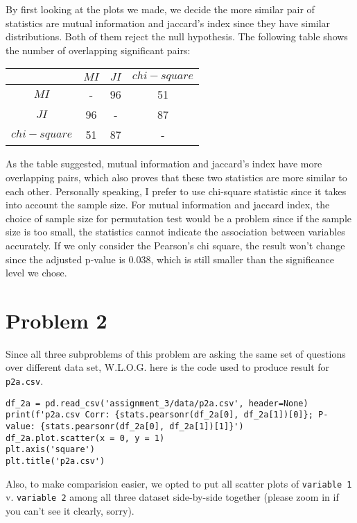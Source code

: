 \documentclass[12pt]{article}
\newcommand{\ilc}{\texttt}
\begin{document}
By first looking at the plots we made, we decide the more similar pair of statistics are mutual information and jaccard's index since they have similar distributions. Both of them reject the null hypothesis.
The following table shows the number of overlapping significant pairs:
\begin{center}
  \begin{tabular}{ | c | c | c | c |}
    \hline
     & $MI$ & $JI$ & $chi-square$\\
    \hline
    $MI$ & -  & 96 & 51 \\
    \hline
    $JI$ & 96 & - & 87\\
    \hline
    $chi-square$ & 51 & 87 & - \\
    \hline
\end{tabular}
\end{center}
As the table suggested, mutual information and jaccard's index have more overlapping pairs, which also proves that these two statistics are more similar to each other.
Personally speaking, I prefer to use chi-square statistic since it takes into account the sample size. For mutual information and jaccard index, the choice of sample size
for permutation test would be a problem since if the sample size is too small, the statistics cannot indicate the association between variables accurately. If we only consider
the Pearson's chi square, the result won't change since the adjusted p-value is $0.038$, which is still smaller than the significance level we chose.

\newpage

\section*{Problem 2}

Since all three subproblems of this problem are asking the same set of questions over different data set, W.L.O.G. here is the code used to produce result for \ilc{p2a.csv}.


\begin{lstlisting}
df_2a = pd.read_csv('assignment_3/data/p2a.csv', header=None)
print(f'p2a.csv Corr: {stats.pearsonr(df_2a[0], df_2a[1])[0]}; P-value: {stats.pearsonr(df_2a[0], df_2a[1])[1]}')
df_2a.plot.scatter(x = 0, y = 1)
plt.axis('square')
plt.title('p2a.csv')
\end{lstlisting}

\noindent Also, to make comparision easier, we opted to put all scatter plots of \ilc{variable 1} v. \ilc{variable 2} among all three dataset side-by-side together (please zoom in if you can't see it clearly, sorry).
\end{document}
